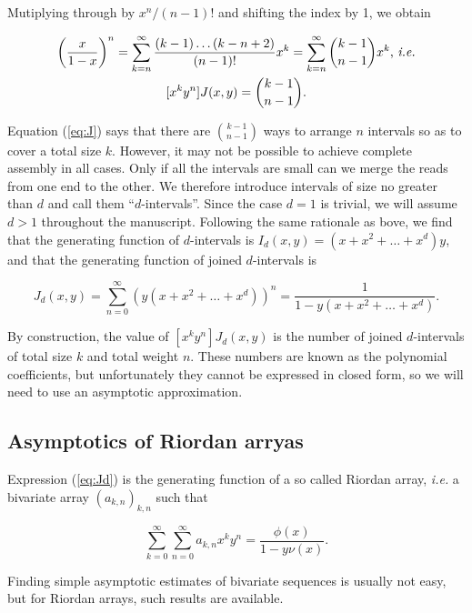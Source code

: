 \documentclass{article}
\begin{document}
Mutiplying through by $x^n/(n-1)!$ and shifting the index by 1, we obtain

\begin{gather}
\notag
\left( \frac{x}{1-x} \right)^n =
\sum_{k=n}^\infty \frac{(k-1) \ldots (k-n+2)}{(n-1)!} x^k
= \sum_{k=n}^\infty {k-1 \choose n-1} x^k \text{, \textit{i.e.}} \\
\label{eq:J}
[x^ky^n]J(x,y) = {k-1 \choose n-1}.
\end{gather}

Equation (\ref{eq:J}) says that there are ${k-1 \choose n-1}$ ways to
arrange $n$ intervals so as to cover a total size $k$. However, it may not
be possible to achieve complete assembly in all cases. Only if all the
intervals are small can we merge the reads from one end to the other.  We
therefore introduce intervals of size no greater than $d$ and call them
``$d$-intervals''. Since the case $d=1$ is trivial, we will assume $d > 1$
throughout the manuscript.  Following the same rationale as bove, we find
that the generating function of $d$-intervals is $I_d(x,y) =
(x+x^2+\ldots+x^d)y$, and that the generating function of joined
$d$-intervals is

\begin{equation}
\label{eq:Jd}
J_d(x,y) = \sum_{n=0}^\infty \left(y(x+x^2+\ldots+x^d)\right)^n =
\frac{1}{1-y(x+x^2+\ldots+x^d)}.
\end{equation}

By construction, the value of $[x^ky^n]J_d(x,y)$ is the number of joined
$d$-intervals of total size $k$ and total weight $n$. These numbers are
known as the polynomial coefficients, but unfortunately they cannot be
expressed in closed form, so we will need to use an asymptotic
approximation.

\subsection{Asymptotics of Riordan arryas}

Expression (\ref{eq:Jd}) is the generating function of a so called Riordan
array, \textit{i.e.} a bivariate array $(a_{k,n})_{k,n}$ such that

\begin{equation*}
\sum_{k=0}^\infty \sum_{n=0}^\infty a_{k,n} x^k y^n =
\frac{\phi(x)}{1-y \nu(x)}.
\end{equation*}

Finding simple asymptotic estimates of bivariate sequences is usually not
easy, but for Riordan arrays, such results are available.
\end{document}

